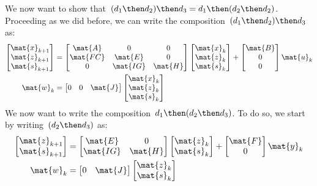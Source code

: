 We now want to show that~$(d_1\then d_2)\then d_3=d_1\then (d_2\then d_2)$. Proceeding as we did before, we can write the composition~$(d_1\then d_2)\then d_3$ as:
\begin{equation*}
  \label{eq:dlin-5}
  \begin{aligned}
    \begin{bmatrix}
      \mat{x}_{k+1}\\
      \mat{z}_{k+1}\\
      \mat{s}_{k+1}
    \end{bmatrix}&=
    \begin{bmatrix}
      \mat{A}&0&0\\
      \mat{FC}&\mat{E}&0\\
      0&\mat{IG}&\mat{H}
    \end{bmatrix}\begin{bmatrix}
                   \mat{x}_k\\ \mat{z}_k\\ \mat{s}_k
    \end{bmatrix}+
    \begin{bmatrix}
      \mat{B}\\ 0\\ 0
    \end{bmatrix}\mat{u}_k\\
    \mat{w}_k&=\begin{bmatrix} 0&0&\mat{J}\end{bmatrix}\begin{bmatrix}\mat{x}_k\\ \mat{z}_k\\ \mat{s}_k\end{bmatrix}
  \end{aligned}
\end{equation*}
We now want to write the composition~$d_1\then (d_2\then d_3)$. To do so, we start by writing~$(d_2\then d_3)$ as:
\begin{equation*}
  \label{eq:dlin-6}
  \begin{aligned}
    \begin{bmatrix}
      \mat{z}_{k+1}\\
      \mat{s}_{k+1}
    \end{bmatrix}&=
    \begin{bmatrix}
      \mat{E}&0\\
      \mat{IG}&\mat{H}
    \end{bmatrix}\begin{bmatrix}
                   \mat{z}_k\\ \mat{s}_k
    \end{bmatrix}+
    \begin{bmatrix}
      \mat{F}\\ 0
    \end{bmatrix}\mat{y}_k\\
    \mat{w}_k&=\begin{bmatrix}0&\mat{J}\end{bmatrix}\begin{bmatrix}\mat{z}_k\\ \mat{s}_k\end{bmatrix}
  \end{aligned}
\end{equation*}
